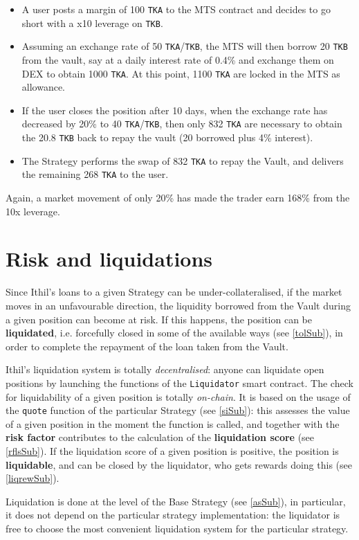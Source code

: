 \documentclass[a4paper,10 pt]{article}
\theoremstyle{definition}
\begin{document}
\begin{itemize}
\item A user posts a margin of 100 \verb|TKA| to the MTS contract and decides to go short with a x10 leverage on \verb|TKB|.
\item Assuming an exchange rate of 50 \verb|TKA|/\verb|TKB|, the MTS will then borrow 20 \verb|TKB| from the vault, say at a daily interest rate of 0.4\% and exchange them on DEX to obtain 1000 \verb|TKA|. At this point, 1100 \verb|TKA| are locked in the MTS as allowance.
\item If the user closes the position after 10 days, when the exchange rate has decreased by 20\% to 40 \verb|TKA|/\verb|TKB|, then only 832 \verb|TKA| are necessary to obtain the 20.8 \verb|TKB| back to repay the vault (20 borrowed plus 4\% interest).
\item The Strategy performs the swap of 832 \verb|TKA| to repay the Vault, and delivers the remaining 268 \verb|TKA| to the user. 
\end{itemize}
Again, a market movement of only 20\% has made the trader earn 168\% from the 10x leverage.

\section{Risk and liquidations}\label{liqSec}
Since Ithil's loans to a given Strategy can be under-collateralised, if the market moves in an unfavourable direction, the liquidity borrowed from the Vault during a given position can become at risk. If this happens, the position can be {\bf liquidated}, i.e. forcefully closed in some of the available ways (see \ref{tolSub}), in order to complete the repayment of the loan taken from the Vault.

Ithil's liquidation system is totally {\it decentralised}: anyone can liquidate open positions by launching the functions of the \verb|Liquidator| smart contract. The check for liquidability of a given position is totally {\it on-chain}. It is based on the usage of the \verb|quote| function of the particular Strategy (see \ref{siSub}): this assesses the value of a given position in the moment the function is called, and together with the {\bf risk factor} contributes to the calculation of the {\bf liquidation score} (see \ref{rflsSub}). If the liquidation score of a given position is positive, the position is {\bf liquidable}, and can be closed by the liquidator, who gets rewards doing this (see \ref{liqrewSub}).

Liquidation is done at the level of the Base Strategy (see \ref{asSub}), in particular, it does not depend on the particular strategy implementation: the liquidator is free to choose the most convenient liquidation system for the particular strategy.
\end{document}
